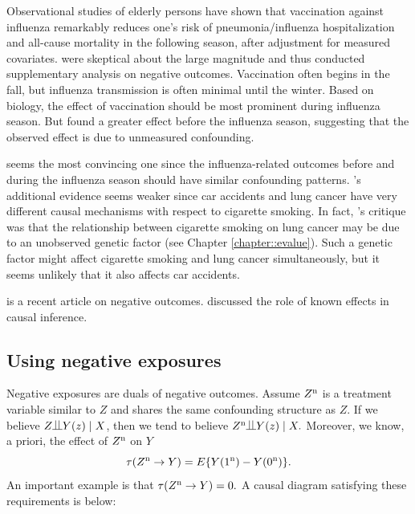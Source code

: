 \begin{example}
Observational studies of elderly persons have shown that vaccination against influenza remarkably reduces one's risk of pneumonia/influenza hospitalization and all-cause mortality in the following season, after adjustment for measured covariates. \citet{jackson2006evidence} were skeptical about the large magnitude and thus conducted supplementary analysis on negative outcomes. Vaccination often begins in the fall, but influenza transmission is often minimal until the winter. Based on biology, the effect of vaccination should be most prominent during influenza season. But \citet{jackson2006evidence} found a greater effect before the influenza season, suggesting that the observed effect is due to unmeasured confounding. 
\end{example}

\citet{jackson2006evidence} seems the most convincing one since the influenza-related outcomes before and during the influenza season should have similar confounding patterns. \citet{Cornfield::1959}'s additional evidence seems weaker since car accidents and lung cancer have very different causal mechanisms with respect to cigarette smoking. In fact, \citet{Fisher::1957}'s critique was that the relationship between cigarette smoking on lung cancer may be due to an unobserved genetic factor (see Chapter \ref{chapter::evalue}). Such a genetic factor might affect cigarette smoking and lung cancer simultaneously, but it seems unlikely that it also affects car accidents.  


\citet{lipsitch2010negative} is a recent article on negative outcomes. 
\citet{rosenbaum1989role} discussed the role of known effects in causal inference. 

 

\subsection{Using negative exposures}

 


Negative exposures are duals of negative outcomes. 
Assume $Z^\textup{n}$ is a treatment variable similar to $Z$ and shares the same confounding structure as $Z$. If we believe $Z \ind Y  (z) \mid X$, then we tend to believe
$
Z^\textup{n}\ind Y  (z) \mid X.
$
Moreover, we know, a priori, the effect of $Z^\textup{n}$ on $Y $ 
$$
\tau(Z^\textup{n}\rightarrow Y  )
= 
E\{  Y(1^\textup{n}) - Y (0^\textup{n}) \}.
$$
An important example is that $\tau(Z^\textup{n}\rightarrow Y  ) = 0.$ A causal diagram satisfying these requirements is below:


